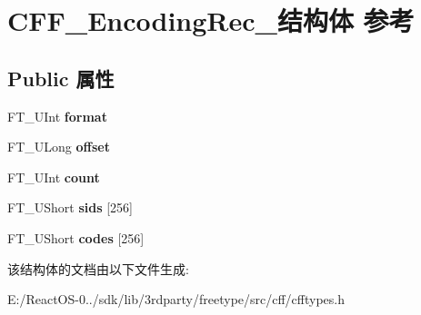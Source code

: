 \hypertarget{struct_c_f_f___encoding_rec__}{}\section{C\+F\+F\+\_\+\+Encoding\+Rec\+\_\+结构体 参考}
\label{struct_c_f_f___encoding_rec__}
\subsection*{Public 属性}
\begin{DoxyCompactItemize}
\item 
\mbox{\label{struct_c_f_f___encoding_rec___afa8daf27202e7173039d763587d99dff}} 
F\+T\+\_\+\+U\+Int {\bfseries format}
\item 
\mbox{\label{struct_c_f_f___encoding_rec___abd4c0f63590e61f684df1e811c56435e}} 
F\+T\+\_\+\+U\+Long {\bfseries offset}
\item 
\mbox{\label{struct_c_f_f___encoding_rec___aaa988f846f3d3b7615d5b05286e89d33}} 
F\+T\+\_\+\+U\+Int {\bfseries count}
\item 
\mbox{\label{struct_c_f_f___encoding_rec___a7a042b5015140ee3c81171ecf3167c35}} 
F\+T\+\_\+\+U\+Short {\bfseries sids} \mbox{[}256\mbox{]}
\item 
\mbox{\label{struct_c_f_f___encoding_rec___a995f129f6387cf1fe32dd7376c89b668}} 
F\+T\+\_\+\+U\+Short {\bfseries codes} \mbox{[}256\mbox{]}
\end{DoxyCompactItemize}


该结构体的文档由以下文件生成\+:\begin{DoxyCompactItemize}
\item 
E\+:/\+React\+O\+S-\/0../sdk/lib/3rdparty/freetype/src/cff/cfftypes.\+h\end{DoxyCompactItemize}
